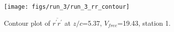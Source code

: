 \begin{figure}[H]
\centering
\texttt{[image: figs/run\_3/run\_3\_rr\_contour]}
\caption{Contour plot of $\overline{r^\prime r^\prime}$ at $z/c$=5.37, $V_{free}$=19.43, station 1.}
\label{fig:run_3_rr_contour}
\end{figure}


